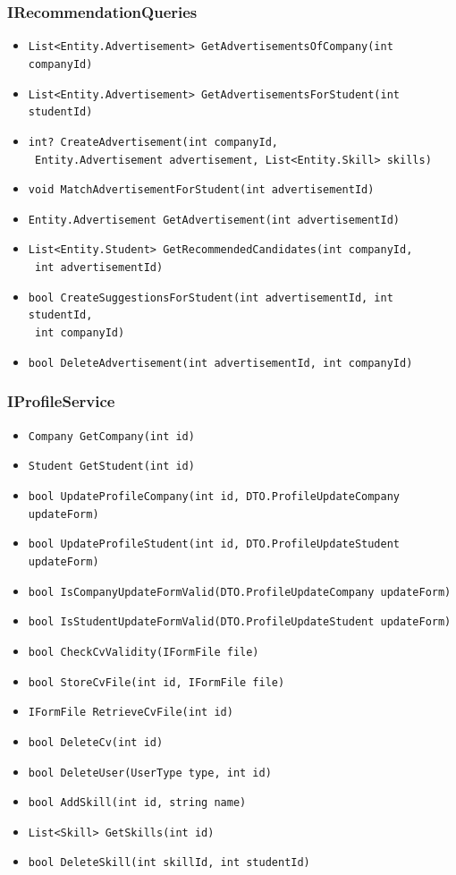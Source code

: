 \subsubsection{IRecommendationQueries}
\begin{itemize}
    \item \verb|List<Entity.Advertisement> GetAdvertisementsOfCompany(int companyId)|
    \item \verb|List<Entity.Advertisement> GetAdvertisementsForStudent(int studentId)|
    \item \verb|int? CreateAdvertisement(int companyId,| \\ \makebox[10em][l]{} \verb| Entity.Advertisement advertisement, List<Entity.Skill> skills)|
    \item \verb|void MatchAdvertisementForStudent(int advertisementId)|
    \item \verb|Entity.Advertisement GetAdvertisement(int advertisementId)|
    \item \verb|List<Entity.Student> GetRecommendedCandidates(int companyId,| \\ \makebox[10em][l]{} \verb| int advertisementId)|
    \item \verb|bool CreateSuggestionsForStudent(int advertisementId, int studentId,| \\ \makebox[10em][l]{} \verb| int companyId)|
    \item \verb|bool DeleteAdvertisement(int advertisementId, int companyId)|
\end{itemize}

\subsubsection{IProfileService}
\begin{itemize}
    \item \verb|Company GetCompany(int id)|
    \item \verb|Student GetStudent(int id)|
    \item \verb|bool UpdateProfileCompany(int id, DTO.ProfileUpdateCompany updateForm)|
    \item \verb|bool UpdateProfileStudent(int id, DTO.ProfileUpdateStudent updateForm)|
    \item \verb|bool IsCompanyUpdateFormValid(DTO.ProfileUpdateCompany updateForm)|
    \item \verb|bool IsStudentUpdateFormValid(DTO.ProfileUpdateStudent updateForm)|
    \item \verb|bool CheckCvValidity(IFormFile file)|
    \item \verb|bool StoreCvFile(int id, IFormFile file)|
    \item \verb|IFormFile RetrieveCvFile(int id)|
    \item \verb|bool DeleteCv(int id)|
    \item \verb|bool DeleteUser(UserType type, int id)|
    \item \verb|bool AddSkill(int id, string name)|
    \item \verb|List<Skill> GetSkills(int id)|
    \item \verb|bool DeleteSkill(int skillId, int studentId)|
\end{itemize}

